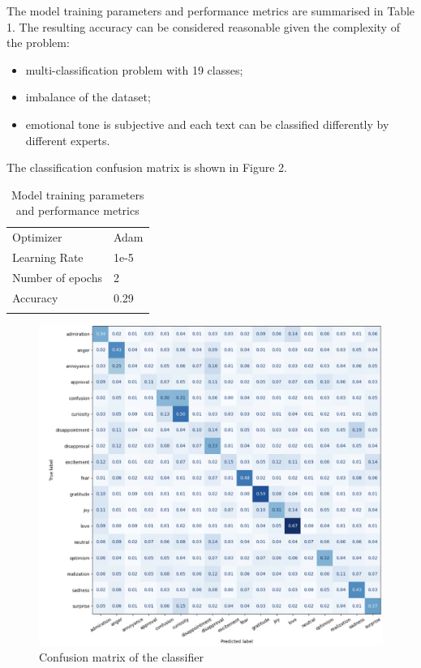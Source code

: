 \documentclass[pdflatex,sn-mathphys-num]{sn-jnl}%
\begin{document}
The model training parameters and performance metrics are summarised in Table 1.
The resulting accuracy can be considered reasonable given the complexity of the problem:
\begin{itemize}
	\item multi-classification problem with 19 classes; 
	\item imbalance of the dataset;
	\item emotional tone is subjective and each text can be classified differently by different experts.
\end{itemize}

The classification confusion matrix is shown in Figure 2.
\begin{table}[h]
	\caption{Model training parameters and performance metrics}\label{tab_2-1}%
	\begin{tabular}{@{}p{4cm}p{4cm}}
		\toprule
		Optimizer & Adam \\ 
		Learning Rate & 1e-5 \\ 
		Number of epochs & 2 \\
		Accuracy & 0.29\\ 
		\botrule
	\end{tabular}
\end{table}

\begin{figure}[h]
	\centering
	\includegraphics[width=12cm]{f2-confusion_matrix.png}
	\caption{Confusion matrix of the classifier}
\end{figure}
\end{document}

